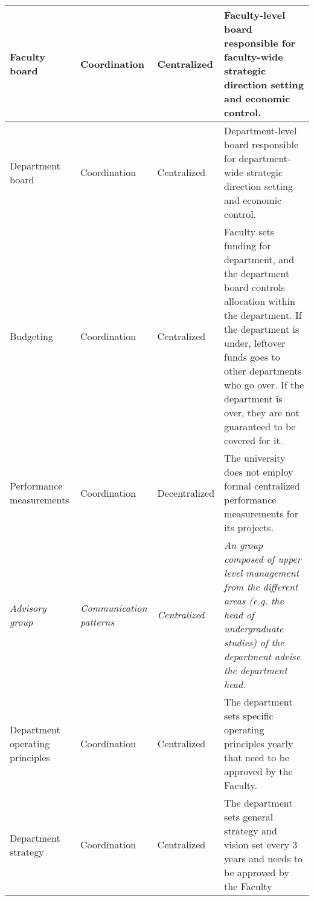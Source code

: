\begin{center}
\begin{longtable}{ | p{} | p{}| p{} | p{}|}
 Faculty board &
 Coordination &
 Centralized &
 Faculty-level board responsible for faculty-wide strategic direction setting and economic control. \\
%
\hline
%
%
 Department board &
 Coordination &
 Centralized &
 Department-level board responsible for department-wide strategic direction setting and economic control. \\
%
\hline
%
 Budgeting &
 Coordination &
 Centralized &
 Faculty sets funding for department, and the department board controls allocation within the department. If the department is under, leftover funds goes to other departments who go over. If the department is over, they are not guaranteed to be covered for it. \\
%
\hline
%
%
 Performance measurements &
 Coordination &
 Decentralized &
 The university does not employ formal centralized performance measurements for its projects.  \\
%
\hline
%
 \textit{Advisory group} &
 \textit{Communication patterns} &
 \textit{Centralized} &
 \textit{An group composed of upper level management from the different areas (e.g. the head of undergraduate studies) of the department advise the department head.} \\
%
\hline
%
%
 Department operating principles &
 Coordination &
 Centralized &
 The department sets specific operating principles  yearly that need to be approved by the Faculty. \\
%
\hline
%
%
 Department strategy &
 Coordination &
 Centralized &
 The department sets general strategy and vision set every 3 years and needs to be approved by the Faculty \\
%
\hline

\end{longtable}
\end{center}

